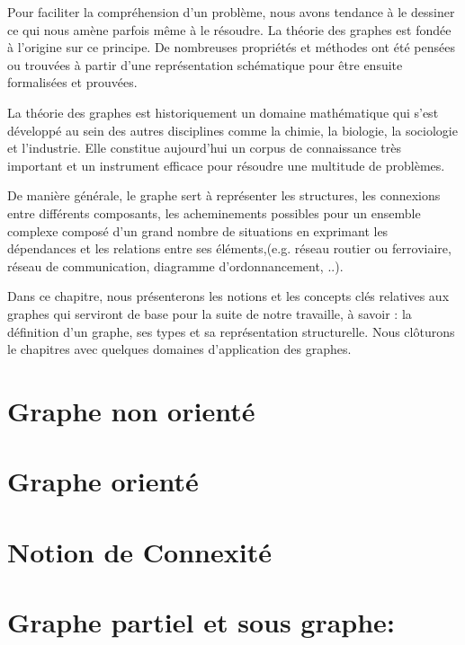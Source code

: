 Pour faciliter la compréhension d'un problème, nous avons tendance à  le dessiner ce qui nous amène parfois même à le résoudre. La théorie des graphes est fondée à l'origine sur ce principe. De nombreuses propriétés et méthodes ont été pensées ou trouvées à partir d'une représentation schématique pour être ensuite formalisées et prouvées.


La théorie des graphes est historiquement un domaine mathématique qui s'est développé  au sein des autres disciplines comme la chimie, la biologie, la sociologie et l'industrie. Elle constitue aujourd'hui un corpus de connaissance très important et un instrument efficace pour résoudre une multitude de problèmes.


De manière générale, le graphe sert à représenter les structures, les connexions entre différents composants, les acheminements possibles pour un ensemble complexe composé d'un grand nombre de situations en exprimant les dépendances et les relations entre ses éléments,(e.g. réseau routier ou ferroviaire, réseau de communication, diagramme d'ordonnancement, ..). 


Dans ce chapitre, nous présenterons les notions et les concepts clés relatives aux graphes qui serviront de base pour la suite de notre travaille, à savoir : la définition d'un graphe, ses types et sa représentation structurelle. Nous clôturons le chapitres avec quelques domaines d'application des graphes.

	
	\section{Graphe non orienté}
		
			
	\section{Graphe orienté}	
		
		
	\section{Notion de Connexité}
	
	
	
	
	
	\section{Graphe partiel et sous graphe:}
    				
	

